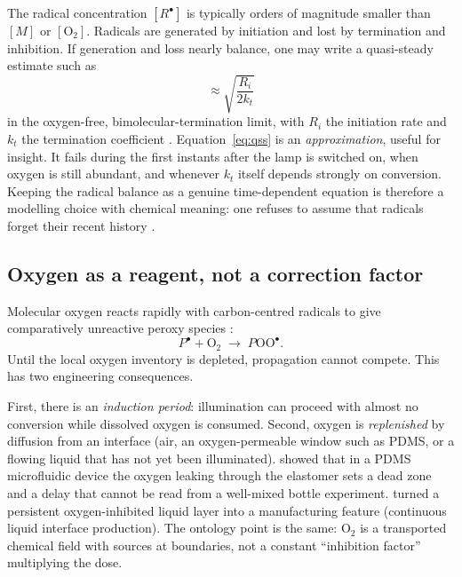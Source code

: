 \documentclass[11pt,a4paper]{article}
\begin{document}
The radical concentration $[R^\bullet]$ is typically orders of magnitude smaller than $[M]$ or $[\mathrm{O}_2]$.
Radicals are generated by initiation and lost by termination and inhibition.
If generation and loss nearly balance, one may write a quasi-steady estimate such as
\begin{equation}
  [R^\bullet] \approx \sqrt{\frac{R_i}{2k_t}}
  \label{eq:qss}
\end{equation}
in the oxygen-free, bimolecular-termination limit, with $R_i$ the initiation rate and $k_t$ the termination coefficient \citep{Zhu2020}.
Equation~\eqref{eq:qss} is an \emph{approximation}, useful for insight.
It fails during the first instants after the lamp is switched on, when oxygen is still abundant, and whenever $k_t$ itself depends strongly on conversion.
Keeping the radical balance as a genuine time-dependent equation is therefore a modelling choice with chemical meaning: one refuses to assume that radicals forget their recent history \citep{Montgomery2022,Dobson2024,Slutzky2019}.

\subsection{Oxygen as a reagent, not a correction factor}

Molecular oxygen reacts rapidly with carbon-centred radicals to give comparatively unreactive peroxy species \citep{Decker1985,Dendukuri2008,Slutzky2019,Montgomery2022}:
\begin{equation}
  P^\bullet + \mathrm{O}_2 \;\longrightarrow\; P\mathrm{OO}^\bullet.
  \label{eq:oxygen}
\end{equation}
Until the local oxygen inventory is depleted, propagation cannot compete.
This has two engineering consequences.

First, there is an \emph{induction period}: illumination can proceed with almost no conversion while dissolved oxygen is consumed.
Second, oxygen is \emph{replenished} by diffusion from an interface (air, an oxygen-permeable window such as PDMS, or a flowing liquid that has not yet been illuminated).
\citet{Dendukuri2008} showed that in a PDMS microfluidic device the oxygen leaking through the elastomer sets a dead zone and a delay that cannot be read from a well-mixed bottle experiment.
\citet{Tumbleston2015} turned a persistent oxygen-inhibited liquid layer into a manufacturing feature (continuous liquid interface production).
The ontology point is the same: $\mathrm{O}_2$ is a transported chemical field with sources at boundaries, not a constant ``inhibition factor'' multiplying the dose.
\end{document}
